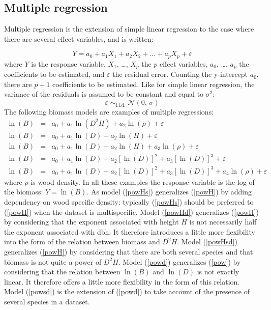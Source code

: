 \subsection{Multiple regression}

Multiple regression is the extension of simple linear regression to the case where there are several effect variables, and is written:

\begin{equation}
Y=a_0+a_1X_1+a_2X_2+\ldots+a_pX_p+\varepsilon\label{regmul}
\end{equation}
where $Y$ is the response variable, $X_1$, \ldots, $X_p$ the $p$ effect variables, $a_0$, \ldots, $a_p$ the coefficients to be estimated, and $\varepsilon$ the residual error. Counting the y-intercept $a_0$, there are $p+1$ coefficients to be estimated. Like for simple linear regression, the variance of the residuals is assumed to be constant and equal to $\sigma^2$:
\[
\varepsilon\;\mathop{\sim}_{\mathrm{i.i.d.}}\;\mathcal{N}(0,\,\sigma)
\]
The following biomass models are examples of multiple regressions:
\begin{eqnarray}
\ln(B) &=& a_0+a_1\ln(D^2H)+a_2\ln(\rho)+\varepsilon\label{powHs}\\ %
\ln(B) &=& a_0+a_1\ln(D)+a_2\ln(H)+\varepsilon\label{powHd}\\ %
\ln(B) &=& a_0+a_1\ln(D)+a_2\ln(H)+a_3\ln(\rho)+\varepsilon\label{powHsd}\\ %
\ln(B) &=& a_0+a_1\ln(D)+a_2[\ln(D)]^2+a_3[\ln(D)]^3+\varepsilon\label{powd}\\ %
\ln(B) &=& a_0+a_1\ln(D)+a_2[\ln(D)]^2+a_3[\ln(D)]^3+a_4\ln(\rho)+\varepsilon\label{powsd}%
\end{eqnarray}
where $\rho$ is wood density. In all these examples the response variable is the log of the biomass: $Y=\ln(B)$. As model (\ref{powHs}) generalizes (\ref{powH}) by adding dependency on wood specific density: typically (\ref{powHs}) should be preferred to (\ref{powH}) when the dataset is multispecific. Model (\ref{powHd}) generalizes (\ref{powH}) by considering that the exponent associated with height $H$ is not necessarily half the exponent associated with dbh. It therefore introduces a little more flexibility into the form of the relation between biomass and $D^2H$. Model (\ref{powHsd}) generalizes (\ref{powH}) by considering that there are both several species and that biomass is not quite a power of $D^2H$. Model (\ref{powd}) generalizes (\ref{pow}) by considering that the relation between $\ln(B)$ and $\ln(D)$ is not exactly linear. It therefore offers a little more flexibility in the form of this relation. Model (\ref{powsd}) is the extension of (\ref{powd}) to take account of the presence of several species in a dataset.


